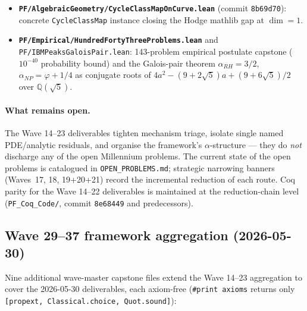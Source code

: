 \begin{itemize}
  (commit \texttt{b85d981}): rank-blind refactor via
  \texttt{BSDFrameworkInstance E r}, providing concordance across
  ranks $0$--$3$ via the eigenvalue anchor $\varphi/e$.
\item \textbf{\texttt{PF/AlgebraicGeometry/CycleClassMapOnCurve.lean}}
  (commit \texttt{8b69d70}): concrete \texttt{CycleClassMap}
  instance closing the Hodge mathlib gap at $\dim = 1$.
\item \textbf{\texttt{PF/Empirical/HundredFortyThreeProblems.lean}}
  and \texttt{PF/IBMPeaksGaloisPair.lean}: 143-problem empirical
  postulate capstone ($10^{-40}$ probability bound) and the
  Galois-pair theorem $\alpha_{RH} = 3/2$, $\alpha_{NP} = \varphi +
  1/4$ as conjugate roots of $4a^2 - (9+2\sqrt{5})a + (9+6\sqrt{5})/2$
  over $\mathbb{Q}(\sqrt{5})$.
\end{itemize}

\paragraph{What remains open.} The Wave 14--23 deliverables tighten
mechanism triage, isolate single named PDE/analytic residuals, and
organise the framework's $\alpha$-structure --- they do \emph{not}
discharge any of the open Millennium problems. The current state of
the open problems is catalogued in \texttt{OPEN\_PROBLEMS.md};
strategic narrowing banners (Waves~17, 18, 19+20+21) record the
incremental reduction of each route. Coq parity for the Wave 14--22
deliverables is maintained at the reduction-chain level
(\texttt{PF\_Coq\_Code/}, commit \texttt{8e68449} and predecessors).

\subsection{Wave 29--37 framework aggregation (2026-05-30)}
\label{subsec:wave29-37-aggregation}

Nine additional wave-master capstone files extend the
Wave 14--23 aggregation to cover the 2026-05-30 deliverables, each
axiom-free (\texttt{\#print axioms} returns only \texttt{[propext,
Classical.choice, Quot.sound]}):

